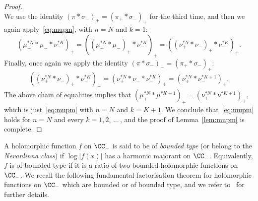 \begin{proof}
\[\]
We use the identity $(\pi * \sigma_-)_+ = (\pi_+ * \sigma_-)_+$ for the third time, and then we again apply~\eqref{eq:mupm}, with $n = N$ and $k = 1$:
\[
\left(\mu_+^{*N} * \mu_- * \nu_-^{*K}\right)_+ = \left(\left(\mu_+^{*N} * \mu_-\right)_+ * \nu_-^{*K}\right)_+ = \left(\left(\nu_+^{*N} * \nu_-\right)_+ * \nu_-^{*K}\right)_+.
\]
Finally, once again we apply the identity $(\pi * \sigma_-)_+ = (\pi_+ * \sigma_-)_+$:
\[
\left(\left(\nu_+^{*N} * \nu_-\right)_+ * \nu_-^{*K}\right)_+ = \left(\nu_+^{*N} * \nu_- * \nu_-^{*K}\right)_+ = \left(\nu_+^{*N} * \nu_-^{*K + 1}\right)_+.
\]
The above chain of equalities implies that $(\mu_+^{*N} * \mu_-^{*K + 1})_+ = (\nu_+^{*N} * \nu_-^{*K + 1})_+$, which is just~\eqref{eq:mupm} with $n = N$ and $k = K + 1$. We conclude that~\eqref{eq:mupm} holds for $n = N$ and every $k = 1, 2,\,\ldots\,$, and the proof of Lemma~\ref{lem:mupm} is complete.
\end{proof}

A holomorphic function $f$ on $\CC_-$ is said to be of \emph{bounded type} (or belong to the \emph{Nevanlinna class}) if $\log |f(x)|$ has a harmonic majorant on $\CC_-$. Equivalently, $f$ is of bounded type if it is a ratio of two bounded holomorphic functions on $\CC_-$. We recall the following fundamental factorisation theorem for holomorphic functions on $\CC_-$ which are bounded or of bounded type, and we refer to~\cite{bib:g07,bib:m09} for further details.

